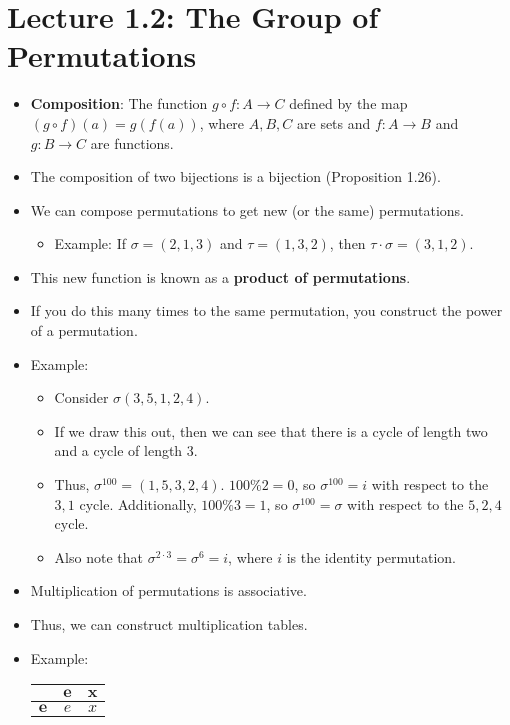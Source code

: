 \documentclass[../apprentice.tex]{subfiles}
\begin{document}
\section{Lecture 1.2: The Group of Permutations}
\begin{itemize}
    \item \textbf{Composition}: The function $g\circ f:A\to C$ defined by the map $(g\circ f)(a)=g(f(a))$, where $A,B,C$ are sets and $f:A\to B$ and $g:B\to C$ are functions.
    \item The composition of two bijections is a bijection (Proposition 1.26).
    \item We can compose permutations to get new (or the same) permutations.
    \begin{itemize}
        \item Example: If $\sigma=(2,1,3)$ and $\tau=(1,3,2)$, then $\tau\cdot\sigma=(3,1,2)$.
    \end{itemize}
    \item This new function is known as a \textbf{product of permutations}.
    \item If you do this many times to the same permutation, you construct the power of a permutation.
    \item Example:
    \begin{itemize}
        \item Consider $\sigma(3,5,1,2,4)$.
        \item If we draw this out, then we can see that there is a cycle of length two and a cycle of length 3.
        \item Thus, $\sigma^{100}=(1,5,3,2,4)$. $100\%2=0$, so $\sigma^{100}=i$ with respect to the $3,1$ cycle. Additionally, $100\%3=1$, so $\sigma^{100}=\sigma$ with respect to the $5,2,4$ cycle.
        \item Also note that $\sigma^{2\cdot 3}=\sigma^6=i$, where $i$ is the identity permutation.
    \end{itemize}
    \item Multiplication of permutations is associative.
    \item Thus, we can construct multiplication tables.
    \item Example:
    \begin{table}[h!]
        \centering
        \renewcommand{\arraystretch}{1.2}
        \begin{tabular}{c|cc}
                     & $\bm{e}$ & $\bm{x}$\\
            \hline
            $\bm{e}$ & $e$      & $x$\\

\end{tabular}
\end{table}
\end{itemize}
\end{document}
